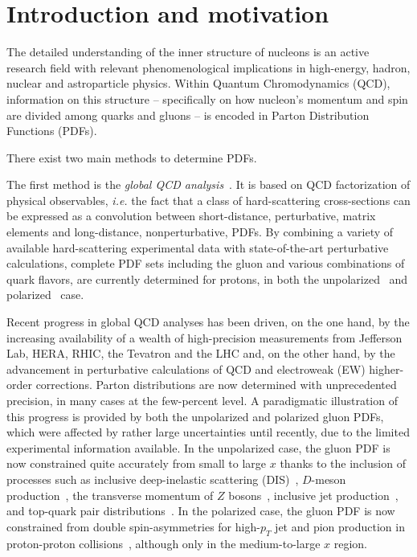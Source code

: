 \section{Introduction and motivation}

The detailed understanding of the inner structure of nucleons is an 
active research field with relevant phenomenological implications in 
high-energy, hadron, nuclear and astroparticle physics.
%
Within Quantum Chromodynamics (QCD), information on this structure --
specifically on how nucleon's momentum and spin are divided among quarks and 
gluons -- is encoded in Parton Distribution Functions (PDFs).

There exist two main methods to determine PDFs.

The first method is the {\it global QCD analysis}~\cite{Perez:2012um,
DeRoeck:2011na,Alekhin:2011sk,Ball:2012wy,Forte:2013wc,Jimenez-Delgado:2013sma,
Rojo:2015acz,Butterworth:2015oua,Accardi:2016ndt,Gao:2017yyd}.
%
It is based on QCD factorization of physical observables, {\it i.e.}
the fact that a class of hard-scattering cross-sections can be expressed as a 
convolution between short-distance, perturbative, matrix 
elements and long-distance, nonperturbative, PDFs.
%
By combining a variety of available hard-scattering experimental data with 
state-of-the-art perturbative calculations, complete PDF sets including 
the gluon and various combinations of quark flavors, are currently determined
for protons, in both the unpolarized~\cite{Ball:2017nwa,Harland-Lang:2014zoa,
Dulat:2015mca,Alekhin:2017kpj,Accardi:2016qay} and 
polarized~\cite{Nocera:2014gqa,deFlorian:2009vb,Sato:2016tuz,Hirai:2008aj} case.

Recent progress in global QCD analyses has been driven, on the one hand, 
by the increasing availability of a wealth of high-precision measurements from 
Jefferson Lab, HERA, RHIC, the Tevatron and the LHC and, on the other hand, 
by the advancement in perturbative calculations of QCD and 
electroweak (EW) higher-order corrections.
%
Parton distributions are now determined with unprecedented precision, 
in many cases at the few-percent level.
%
A paradigmatic illustration of this progress is provided by both the 
unpolarized and polarized gluon PDFs, which were affected by rather large 
uncertainties until recently, due to the limited experimental information 
available.
%
In the unpolarized case, the gluon PDF is now constrained quite accurately from 
small to large $x$ thanks to the inclusion of processes such as 
inclusive deep-inelastic scattering (DIS)~\cite{Abramowicz:2015mha}, 
$D$-meson production~\cite{Zenaiev:2015rfa,Gauld:2016kpd},
the transverse momentum of $Z$ bosons~\cite{Boughezal:2017nla},
inclusive jet production~\cite{Currie:2016bfm}, and top-quark pair
distributions~\cite{Czakon:2016olj,Guzzi:2014wia}.
%
In the polarized case, the gluon PDF is now constrained from double 
spin-asymmetries for high-$p_T$ jet and pion production in proton-proton 
collisions~\cite{deFlorian:2014yva,Nocera:2014gqa}, 
although only in the medium-to-large $x$ region.

